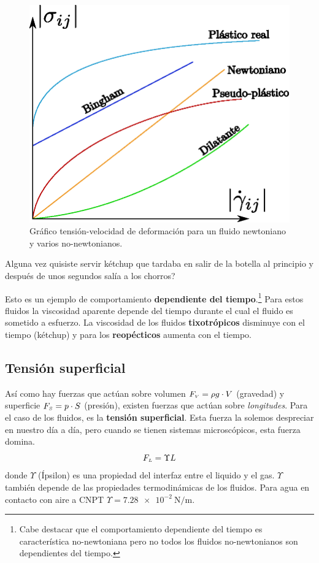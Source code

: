 \begin{figure}[htb!]
	\centering
	\includegraphics[width=.49\textwidth]{fig/deformacion-tensionFluidos.eps}
	\caption{Gráfico tensión-velocidad de deformación para un fluido newtoniano y varios no-newtonianos.}
\end{figure}

\derpq Alguna vez quisiste servir kétchup que tardaba en salir de la botella al principio y después de unos segundos salía a los chorros? 

Esto es un ejemplo de comportamiento \textbf{dependiente del tiempo}.\footnote{Cabe destacar que el comportamiento dependiente del tiempo es característica no-newtoniana pero no todos los fluidos no-newtonianos son dependientes del tiempo.} Para estos fluidos la viscosidad aparente depende del tiempo durante el cual el fluido es sometido a esfuerzo. La viscosidad de los fluidos \textbf{tixotrópicos} disminuye con el tiempo (kétchup) y para los \textbf{reopécticos} aumenta con el tiempo.

\subsection{Tensión superficial}
Así como hay fuerzas que actúan sobre volumen $F_{\mbox{\tiny $V$}}=\rho g\cdot V$ (gravedad) y superficie $F_{\mbox{\tiny $S$}}=p\cdot S$ (presión), existen fuerzas que actúan sobre \textit{longitudes}. Para el caso de los fluidos, es la \textbf{tensión superficial}. Esta fuerza la solemos despreciar en nuestro día a día, pero cuando se tienen sistemas microscópicos, esta fuerza domina.
\[
F_{\mbox{\tiny $L$}} = \Upsilon L
\]%
donde $\Upsilon$ (Ípsilon) es una propiedad del interfaz entre el liquido y el gas. $\Upsilon$ también depende de las propiedades termodinámicas de los fluidos. Para agua en contacto con aire a CNPT $\Upsilon=\SI{7,28e-2}{\newton \per \meter}$.

